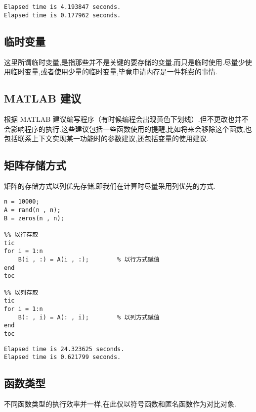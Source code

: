 \vspace{-0.8cm}
\begin{lstlisting}
Elapsed time is 4.193847 seconds.
Elapsed time is 0.177962 seconds.
\end{lstlisting}



\subsection{临时变量}
 这里所谓临时变量,是指那些并不是关键的要存储的变量,而只是临时使用.尽量少使用临时变量,或者使用少量的临时变量,毕竟申请内存是一件耗费的事情.



\subsection{MATLAB 建议}
 根据 MATLAB 建议编写程序（有时候编程会出现黄色下划线）.但不更改也并不会影响程序的执行.这些建议包括一些函数使用的提醒,比如将来会移除这个函数,也包括联系上下文实现某一功能时的参数建议,还包括变量的使用建议.



\subsection{矩阵存储方式}
 矩阵的存储方式以列优先存储,即我们在计算时尽量采用列优先的方式.

\vspace{-0.8cm}
\begin{lstlisting}[caption = 矩阵不同存取方式效率对比]
n = 10000;
A = rand(n , n);
B = zeros(n , n);

%% 以行存取
tic
for i = 1:n
    B(i , :) = A(i , :);        % 以行方式赋值 
end
toc

%% 以列存取
tic
for i = 1:n
    B(: , i) = A(: , i);        % 以列方式赋值
end
toc
\end{lstlisting}

\vspace{-0.8cm}
\begin{lstlisting}
Elapsed time is 24.323625 seconds.
Elapsed time is 0.621799 seconds.
\end{lstlisting}

\subsection{函数类型}
 不同函数类型的执行效率并一样,在此仅以符号函数和匿名函数作为对比对象.

